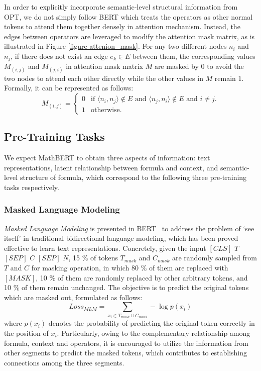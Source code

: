 \documentclass{article}
\begin{document}
In order to explicitly incorporate semantic-level structural information from OPT, we do not simply follow BERT which treats the operators as other normal tokens to attend them together densely in attention mechanism. Instead, the edges between operators are leveraged to modify the attention mask matrix, as is illustrated in Figure \ref{figure-attenion_mask}. For any two different nodes $n_i$ and $n_j$, if there does not exist an edge $ e_k \in E $ between them, the corresponding values $M_{(i,j)}$ and $M_{(j,i)}$ in attention mask matrix $M$ are masked by $0$ to avoid the two nodes to attend each other directly while the other values in $M$ remain $1$. Formally, it can be represented as follows: 
\begin{equation}
    M_{(i,j)} = 
    \begin{cases}
        0 & \text{if $\langle n_i,n_j \rangle \notin E$ and $\langle n_j,n_i \rangle \notin E$ and $i \neq j$}. \\
        1 & \text{otherwise}.
    \end{cases}
\end{equation}

\subsection{Pre-Training Tasks}

We expect MathBERT to obtain three aspects of information: text representations, latent relationship between formula and context, and semantic-level structure of formula, which correspond to the following three pre-training tasks respectively.

\subsubsection{Masked Language Modeling}

\textit{Masked Language Modeling} is presented in BERT~\cite{BERT} to address the problem of ‘see itself’ in traditional bidirectional language modeling, which has been proved effective to learn text representations. Concretely, given the input $[CLS]$ $T$ $[SEP]$ $C$ $[SEP]$ $N$, 15 $\%$ of tokens $T_{mask}$ and $C_{mask}$ are randomly sampled from $T$ and $C$ for masking operation, in which 80 $\%$ of them are replaced with $[MASK]$, 10 $\%$ of them are randomly replaced by other arbitrary tokens, and 10 $\%$ of them remain unchanged. The objective is to predict the original tokens which are masked out, formulated as follows:
\begin{equation}
    Loss_{MLM} = \sum_{x_i \in T_{mask} \cup C_{mask}} -\log p(x_i)
\end{equation}
where $p(x_i)$ denotes the probability of predicting the original token correctly in the position of $x_i$. Particularly, owing to the complementary relationship among formula, context and operators, it is encouraged to utilize the information from other segments to predict the masked tokens, which contributes to establishing connections among the three segments.
\end{document}
